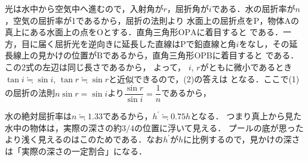 \begin{reidaiunit}

\begin{kaitou}
\begin{komon}
 光は水中から空気中へ進むので，入射角が$r$，屈折角が$i$である．水の屈折率が$n$，空気の屈折率が1であるから，屈折の法則より
 水面上の屈折点を$\mathrm{P}$，物体$\mathrm{A}$の真上にある水面上の点を$\mathrm{O}$とする．直角三角形$\mathrm{OPA}$に着目すると
       である．一方，目に届く屈折光を逆向きに延長した直線は$\mathrm{P}$で鉛直線と角$i$をなし，その延長線上の見かけの位置が$\mathrm{B}$であるから，直角三角形$\mathrm{OPB}$に着目すると
       である．この2式の左辺は同じ長さであるから，
       よって，
 $i$, $r$がともに微小であるとき$\tan i\fallingdotseq\sin i$, $\tan r\fallingdotseq\sin r$と近似できるので，(2)の答えは
       となる．ここで(1)の屈折の法則$n\sin r=\sin i$より$\dfrac{\sin r}{\sin i}=\dfrac{1}{n}$であるから，
\end{komon}
\end{kaitou}

\begin{chuu}
水の絶対屈折率は$n\fallingdotseq 1.33$であるから，$h^\prime\fallingdotseq 0.75h$となる．
つまり{\gtfamily 真上から見た水中の物体は，実際の深さの約$3/4$の位置に浮いて見える}．
プールの底が思ったより浅く見えるのはこのためである．なお$h^\prime$が$h$に比例するので，見かけの深さは「実際の深さの一定割合」になる．
\end{chuu}
\end{reidaiunit}
